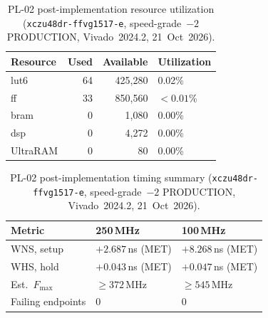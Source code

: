 \leavevmode\par
\begin{table}[!h]
  \caption{PL-02 post-implementation resource utilization
           (\texttt{xczu48dr\allowbreak-ffvg1517\allowbreak-e}, speed-grade~$-2$
           PRODUCTION, Vivado~2024.2, 21~Oct~2026).}
  \label{tab:pl02_resources}
  \centering
  \begin{tabular}{lrrl}
    \hline
    Resource  & Used & Available   & Utilization \\
    \hline
    \ac{lut6} &  64  & 425{,}280   & 0.02\%      \\[2pt]
    \ac{ff}   &  33  & 850{,}560   & $<0.01$\%   \\[2pt]
    \ac{bram} &   0  & 1{,}080     & 0.00\%      \\[2pt]
    \ac{dsp}  &   0  & 4{,}272     & 0.00\%      \\[2pt]
    UltraRAM  &   0  & 80          & 0.00\%      \\
    \hline
  \end{tabular}
\end{table}

\vspace{-30pt}
\leavevmode\par
\begin{table}[!h]
  \caption{PL-02 post-implementation timing summary
           (\texttt{xczu48dr\allowbreak-ffvg1517\allowbreak-e}, speed-grade~$-2$
           PRODUCTION, Vivado~2024.2, 21~Oct~2026).}
  \label{tab:pl02_timing}
  \centering
  \begin{tabular}{lll}
    \hline
    Metric                 & 250\,MHz           & 100\,MHz           \\
    \hline
    WNS, setup             & $+2.687$\,ns (MET) & $+8.268$\,ns (MET) \\[2pt]
    WHS, hold              & $+0.043$\,ns (MET) & $+0.047$\,ns (MET) \\[2pt]
    Est.\ $F_{\max}$       & $\geq 372$\,MHz    & $\geq 545$\,MHz    \\[2pt]
    Failing endpoints      & 0                  & 0                  \\
    \hline
  \end{tabular}
\end{table}
\FloatBarrier



